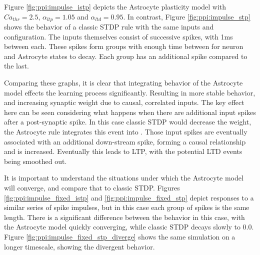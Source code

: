 Figure \ref{fig:ppi:impulse_istp} depicts the Astrocyte plasticity model with
$Ca_{thr}=2.5$, $\alpha_{ltp}=1.05$ and $\alpha_{ltd}=0.95$. In contrast, Figure
\ref{fig:ppi:impulse_stp} shows the behavior of a classic STDP rule with the
same inputs and configuration. The inputs themselves consist of successive
spikes, with 1ms between each. These spikes form groups with enough time between
for neuron and Astrocyte states to decay. Each group has an additional spike
compared to the last.

Comparing these graphs, it is clear that integrating
behavior of the Astrocyte model effects the learning process
significantly. Resulting in more stable behavior, and increasing synaptic weight
due to causal, correlated inputs. The key effect here can be seen considering
what happens when there are additional input spikes after a post-synaptic
spike. In this case classic STDP would decrease the weight, the Astrocyte rule
integrates this event into \ca. Those input spikes are eventually associated
with an additional down-stream spike, forming a causal relationship and \ca is
increased. Eventually this leads to LTP, with the potential LTD events being
smoothed out.



It is important to understand the situations under which the Astrocyte model
will converge, and compare that to classic STDP. Figures
\ref{fig:ppi:impulse_fixed_istp} and \ref{fig:ppi:impulse_fixed_stp} depict
responses to a similar series of spike impulses, but in this case each group of
spikes is the same length. There is a significant difference between the
behavior in this case, with the Astrocyte model quickly converging, while
classic STDP decays slowly to $0.0$. Figure
\ref{fig:ppi:impulse_fixed_stp_diverge} shows the same simulation on a longer
timescale, showing the divergent behavior.



